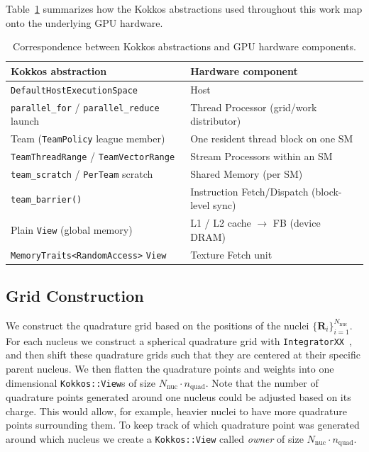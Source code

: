 \documentclass{article}
\begin{document}
Table~\ref{tab:kokkos_hw_mapping} summarizes how the Kokkos
abstractions used throughout this work map onto the underlying GPU
hardware.

\begin{table}[H]
  \centering
  \caption{Correspondence between Kokkos abstractions and GPU
  hardware components.}
  \label{tab:kokkos_hw_mapping}
  \begin{tabular}{@{}l l@{}}
    \toprule
    Kokkos abstraction & Hardware component \\
    \midrule
    \texttt{DefaultHostExecutionSpace}      & Host \\
    \texttt{parallel\_for} / \texttt{parallel\_reduce}
    launch & Thread Processor (grid/work distributor) \\
    Team (\texttt{TeamPolicy} league member) & One
    resident thread block on one SM \\
    \texttt{TeamThreadRange} / \texttt{TeamVectorRange} &
    Stream Processors within an SM \\
    \texttt{team\_scratch} / \texttt{PerTeam} scratch &
    Shared Memory (per SM) \\
    \texttt{team\_barrier()}                & Instruction
    Fetch/Dispatch (block-level sync) \\
    Plain \texttt{View} (global memory)     & L1 / L2
    cache $\to$ FB (device DRAM) \\
    \texttt{MemoryTraits<RandomAccess>} \texttt{View} &
    Texture Fetch unit \\
    \bottomrule
  \end{tabular}
\end{table}

\subsection{Grid Construction}\label{subsec:grid_construction}

We construct the quadrature grid based on the positions of the nuclei
$\{\mathbf R_i\}_{i=1}^{N_\text{nuc}}$. For each nucleus we construct
a spherical quadrature grid with \texttt{IntegratorXX}~\cite{IntegratorXX}, and
then shift these quadrature grids such that they are centered at their specific
parent nucleus. We then flatten the quadrature points and weights into one
dimensional \texttt{Kokkos::View}s of size $N_\text{nuc}\cdot
n_\text{quad}$. Note that the number of quadrature points generated
around one nucleus could be adjusted based on its charge. This would
allow, for example,
heavier nuclei to have more quadrature points surrounding them.
To keep track of which quadrature point was generated around which nucleus we
create a \texttt{Kokkos::View} called
\textit{owner} of size $N_\text{nuc}\cdot
n_\text{quad}$.
\end{document}
